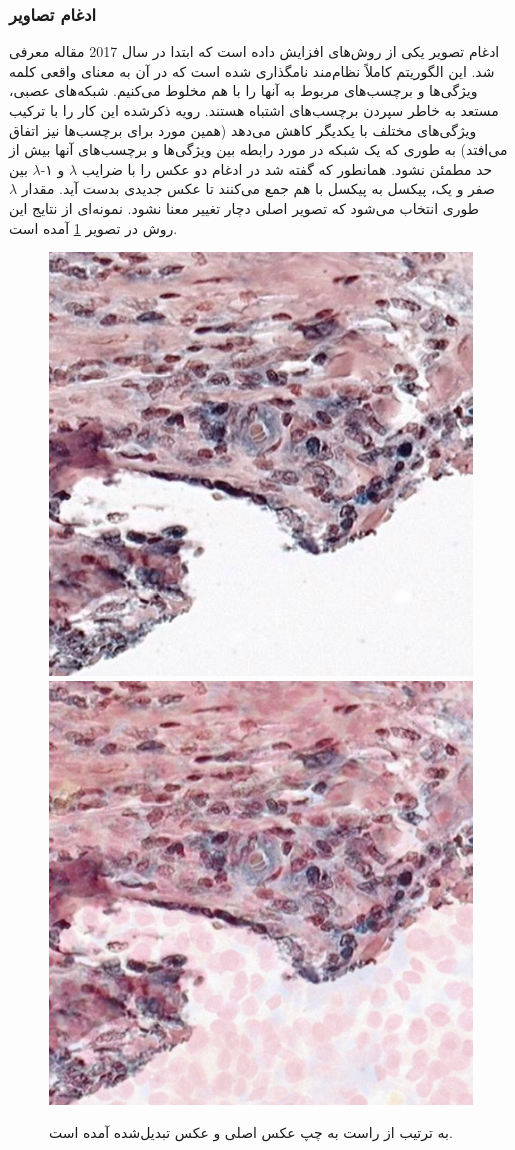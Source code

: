 \subsubsection{ادغام تصاویر}
ادغام تصویر یکی از روش‌های افزایش داده است که ابتدا در سال 2017 مقاله
\cite{zhang2017mixup}
معرفی شد.
این الگوریتم کاملاً نظام‌مند نامگذاری شده است که در آن به معنای واقعی کلمه ویژگی‌ها و برچسب‌های مربوط به آنها را با هم مخلوط می‌کنیم. شبکه‌های عصبی، مستعد به خاطر سپردن برچسب‌های اشتباه هستند. رویه ذکر‌شده این کار را با ترکیب ویژگی‌های مختلف با یکدیگر کاهش می‌دهد (همین مورد برای برچسب‌ها نیز اتفاق می‌افتد) به طوری که یک شبکه در مورد رابطه بین ویژگی‌ها و برچسب‌های آنها بیش از حد مطمئن نشود.
همانطور که گفته شد در ادغام دو عکس را با ضرایب $\lambda$ و ۱-$\lambda$ بین صفر و یک، پیکسل به پیکسل با هم جمع می‌کنند تا عکس جدیدی بدست آید. مقدار $\lambda$ طوری انتخاب می‌شود که تصویر اصلی دچار تغییر معنا نشود.
نمونه‌ای از نتایج این روش در تصویر \ref{mixup augmentation} آمده است.
\begin{figure}
    \begin{center}
        \includegraphics[width=0.48\linewidth]{figs/suggested_methods/subs/data_augmentation/mixup_776-original.jpeg}
        \includegraphics[width=0.48\linewidth]{figs/suggested_methods/subs/data_augmentation/mixup_776-transformed.jpeg}
    \end{center}
    \caption[نمونه‌ای از داده‌افزایی ادغام تصویر]{ به ترتیب از راست به چپ عکس اصلی و عکس تبدیل‌شده آمده است.}
    \label{mixup augmentation}
\end{figure}
